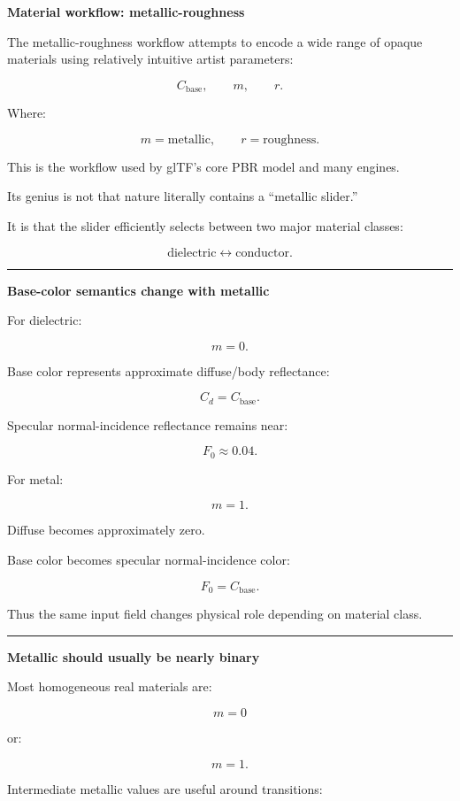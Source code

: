 \textbf{Material workflow: metallic-roughness}

The metallic-roughness workflow attempts to encode a wide range of opaque materials using relatively intuitive artist parameters:

\[
C_{\text{base}},
\qquad
m,
\qquad
r.
\]

Where:

\[
m=\text{metallic},
\qquad
r=\text{roughness}.
\]

This is the workflow used by glTF's core PBR model and many engines.

Its genius is not that nature literally contains a ``metallic slider.''

It is that the slider efficiently selects between two major material classes:

\[
\text{dielectric}
\leftrightarrow
\text{conductor}.
\]

\begin{center}\rule{0.5\linewidth}{0.5pt}\end{center}

\textbf{Base-color semantics change with metallic}

For dielectric:

\[
m=0.
\]

Base color represents approximate diffuse/body reflectance:

\[
C_d=C_{\text{base}}.
\]

Specular normal-incidence reflectance remains near:

\[
F_0\approx0.04.
\]

For metal:

\[
m=1.
\]

Diffuse becomes approximately zero.

Base color becomes specular normal-incidence color:

\[
F_0=C_{\text{base}}.
\]

Thus the same input field changes physical role depending on material class.

\begin{center}\rule{0.5\linewidth}{0.5pt}\end{center}

\textbf{Metallic should usually be nearly binary}

Most homogeneous real materials are:

\[
m=0
\]

or:

\[
m=1.
\]

Intermediate metallic values are useful around transitions:

